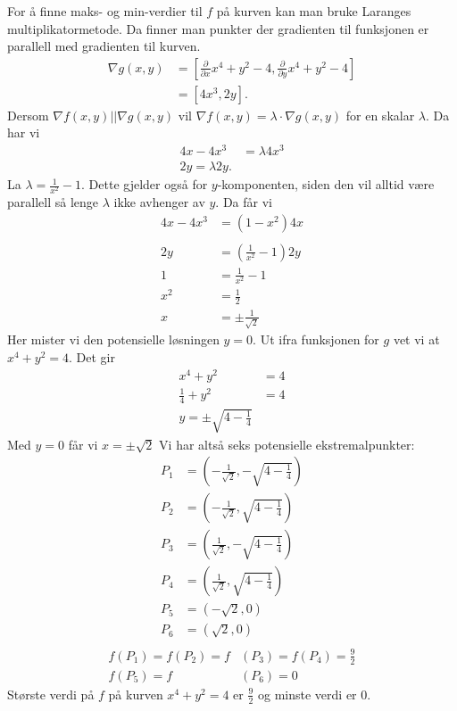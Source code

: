 \documentclass[11pt, a4paper, norsk]{NTNUoving}
\begin{document}
\begin{oppgave}
\begin{punkt}
    For å finne maks- og min-verdier til $f$ på kurven kan man bruke Laranges multiplikatormetode. Da finner man punkter der gradienten til funksjonen er parallell med gradienten til kurven. 
    \begin{align*}
        \nabla g(x, y) &= \left[\frac{\partial }{\partial x}x^4+y^2-4, \frac{\partial }{\partial y}x^4+y^2-4\right]
        \\&=\left[4x^3, 2y\right].
    \end{align*}
    Dersom $\nabla f(x, y) || \nabla g(x, y)$ vil $\nabla f(x, y) = \lambda \cdot \nabla g(x, y)$ for en skalar $\lambda$. Da har vi
    \begin{align*}
        4x-4x^3 &= \lambda 4x^3\\
        2y = \lambda 2y.
    \end{align*}
    La $\lambda =\frac{1}{x^2}-1$. Dette gjelder også for $y$-komponenten, siden den vil alltid være parallell så lenge $\lambda$ ikke avhenger av $y$. Da får vi
    \begin{align*}
        4x-4x^3 &= \left(1-x^2 \right)4x\\
        \\
        2y &= \left(\frac{1}{x^2}-1 \right) 2y
        \\1&=\frac{1}{x^2}-1
        \\x^2 &= \frac{1}{2}
        \\x&=\pm \frac{1}{\sqrt{2}}
    \end{align*}
    Her mister vi den potensielle løsningen $y=0$. Ut ifra funksjonen for $g$ vet vi at $x^4+y^2=4$. Det gir
    \begin{align*}
       x^4+y^2&=4\\
       \frac{1}{4}+y^2&=4\\
       y=\pm \sqrt{4-\frac{1}{4}}
    \end{align*}
    Med $y=0$ får vi $x=\pm \sqrt{2}$
    Vi har altså seks potensielle ekstremalpunkter: 
    \begin{align*}
        P_1&=\left(-\frac{1}{\sqrt{2}}, -\sqrt{4-\frac{1}{4}}\right)\\
        P_2&=\left(-\frac{1}{\sqrt{2}}, \sqrt{4-\frac{1}{4}}\right)\\
        P_3&=\left(\frac{1}{\sqrt{2}}, -\sqrt{4-\frac{1}{4}}\right)\\
        P_4&=\left(\frac{1}{\sqrt{2}}, \sqrt{4-\frac{1}{4}}\right)\\
        P_5&=\left(-\sqrt{2}, 0\right)\\
        P_6&=\left(\sqrt{2}, 0\right)\\
    \end{align*}
    \begin{align*}
        f(P_1)=f(P_2)=f&(P_3)=f(P_4)=\frac{9}{2}\\
        f(P_5)=f&(P_6)=0
    \end{align*}
    Største verdi på $f$ på kurven $x^4+y^2=4$ er $\frac{9}{2}$ og minste verdi er $0$.
\end{punkt}
\end{oppgave}
\end{document}
